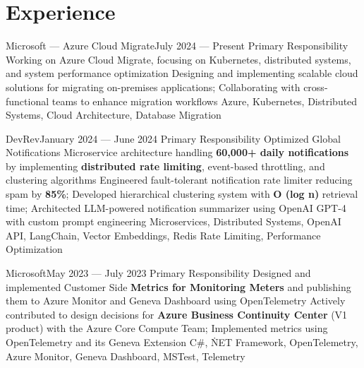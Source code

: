 \section{Experience}
\resumeSubHeadingListStart
{}
{Microsoft --- Azure Cloud Migrate}{July 2024 --- Present}
\resumeItemListStart
      \resumeItem
        {Primary Responsibility}
        {Working on Azure Cloud Migrate, focusing on Kubernetes, distributed systems, and system performance optimization}
      {Designing and implementing scalable cloud solutions for migrating on-premises applications; Collaborating with cross-functional teams to enhance migration workflows}
      {Azure, Kubernetes, Distributed Systems, Cloud Architecture, Database Migration}
  \resumeItemListEnd
\resumeSubHeadingListEnd

\resumeSubHeadingListStart
{}
{DevRev}{January 2024 --- June 2024}
\resumeItemListStart
      \resumeItem
        {Primary Responsibility}
        {Optimized Global Notifications Microservice architecture handling \textbf{60,000+ daily notifications} by implementing \textbf{distributed rate limiting}, event-based throttling, and clustering algorithms}
      {Engineered fault-tolerant notification rate limiter reducing spam by \textbf{85\%}; Developed hierarchical clustering system with \textbf{O (log n)} retrieval time; Architected LLM-powered notification summarizer using OpenAI GPT-4 with custom prompt engineering}
      {Microservices, Distributed Systems, OpenAI API, LangChain, Vector Embeddings, Redis Rate Limiting, Performance Optimization}
\resumeItemListEnd
\resumeSubHeadingListEnd

\resumeSubHeadingListStart
{}
{Microsoft}{May 2023 --- July 2023}
\resumeItemListStart
      \resumeItem
        {Primary Responsibility}
        {Designed and implemented Customer Side \textbf{Metrics for Monitoring Meters} and publishing them to Azure Monitor and Geneva Dashboard using OpenTelemetry}
      {Actively contributed to design decisions for \textbf{Azure Business Continuity Center} (V1 product) with the Azure Core Compute Team; Implemented metrics using OpenTelemetry and its Geneva Extension}
      {C\#, \.NET Framework, OpenTelemetry, Azure Monitor, Geneva Dashboard, MSTest, Telemetry}
\resumeItemListEnd
\resumeSubHeadingListEnd

